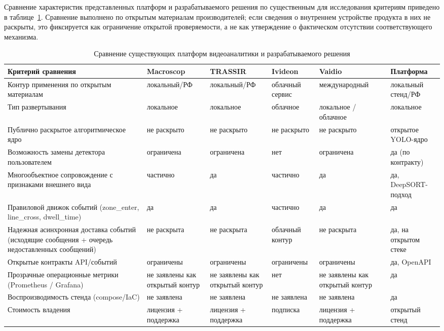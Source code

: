 Сравнение характеристик представленных платформ и разрабатываемого решения по существенным для исследования критериям приведено в таблице~\ref{tab:analogues_comparison}. Сравнение выполнено по открытым материалам производителей; если сведения о внутреннем устройстве продукта в них не раскрыты, это фиксируется как ограничение открытой проверяемости, а не как утверждение о фактическом отсутствии соответствующего механизма.

\begin{table}[H]
\caption{Сравнение существующих платформ видеоаналитики и разрабатываемого решения}
\label{tab:analogues_comparison}
\begingroup
\scriptsize
\setlength{\tabcolsep}{2pt}
\begin{tabularx}{\textwidth}{@{}>{\raggedright\arraybackslash}p{} >{\raggedright\arraybackslash}p{} >{\raggedright\arraybackslash}p{} >{\raggedright\arraybackslash}p{} >{\raggedright\arraybackslash}p{} X@{}}
\toprule
Критерий сравнения & Macroscop & TRASSIR & Ivideon & Vaidio & Платформа \\
\midrule
Контур применения по открытым материалам & локальный/РФ & локальный/РФ & облачный сервис & международный & локальный стенд/РФ \\
Тип развертывания & локальное & локальное & облачное & локальное / облачное & локальное \\
Публично раскрытое алгоритмическое ядро & не раскрыто & не раскрыто & не раскрыто & не раскрыто & открытое YOLO-ядро \\
Возможность замены детектора пользователем & ограничена & ограничена & нет & ограничена & да (по контракту) \\
Многообъектное сопровождение с признаками внешнего вида & частично & да & частично & да & да, DeepSORT-подход \\
Правиловой движок событий (zone\_enter, line\_cross, dwell\_time) & да & да & частично & да & да \\
Надежная асинхронная доставка событий (исходящие сообщения + очередь недоставленных сообщений) & не раскрыта & не раскрыта & облачный контур & не раскрыта & да, на открытом стеке \\
Открытые контракты API/событий & ограничены & ограничены & ограничены & ограничены & да, OpenAPI \\
Прозрачные операционные метрики (Prometheus / Grafana) & не заявлены как открытый контур & не заявлены как открытый контур & нет & не заявлены как открытый контур & да \\
Воспроизводимость стенда (compose/IaC) & не заявлена & не заявлена & не заявлена & не заявлена & да \\
Стоимость владения & лицензия + поддержка & лицензия + поддержка & подписка & лицензия + поддержка & открытый стенд \\
\bottomrule
\end{tabularx}
\endgroup
\end{table}

